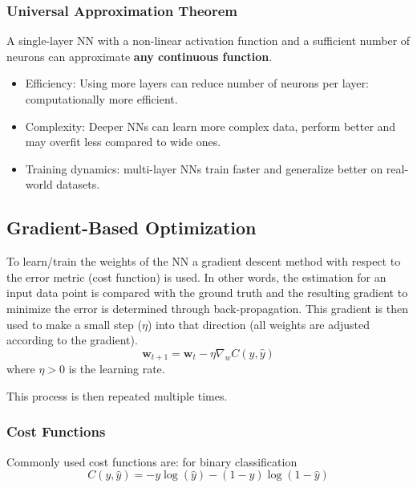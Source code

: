 \subsubsection{Universal Approximation Theorem}
A single-layer NN with a non-linear activation function and a sufficient number of neurons can approximate \textbf{any continuous function}.
\newpar{}
\begin{itemize}
    \item Efficiency: Using more layers can reduce number of neurons per layer: computationally more efficient.
    \item Complexity: Deeper NNs can learn more complex data, perform better and may overfit less compared to wide ones.
    \item Training dynamics: multi-layer NNs train faster and generalize better on real-world datasets.
\end{itemize}

\renewcommand{\arraystretch}{1}
\setlength\tabcolsep{\oldtabcolsep}

\subsection{Gradient-Based Optimization}

To learn/train the weights of the NN a gradient descent method with respect to the error metric (cost function) is used. In other words, the estimation for an input data point is compared with the ground truth and the resulting gradient to minimize the error is determined through back-propagation. This gradient is then used to make a small step ($\eta$) into that direction (all weights are adjusted according to the gradient).
\begin{equation*}
    \mathbf{w}_{t+1} = \mathbf{w}_t - \eta \nabla_w C(y,\hat{y})
\end{equation*}
where $\eta > 0$ is the learning rate.

This process is then repeated multiple times.

\subsubsection{Cost Functions}
Commonly used cost functions are:
\newpar{}
 for binary classification
\begin{equation*}
    C(y,\hat{y}) = -y\log(\hat{y})-(1-y)\log(1-\hat{y})
\end{equation*}

